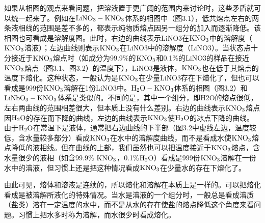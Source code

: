 如果从相图的观点来看问题，把溶液置于更广阔的范围内来讨论时，这些矛盾就可以统一起来了。例如在$\rm LiNO_3-KNO_3$体系的相图中（图3.1），低共熔点左右的两条液相线的范围是差不多的，都表示纯物质熔点因另一组分的加入而逐渐降低。该相图也可看成是溶解度图。此时，右边的曲线表示LiNO3在$\rm KNO_3$中的溶解度（$\rm KNO_3$溶液）；左边曲线则表示$\rm KNO_3$在LiNO3中的溶解度（LiNO3）。当状态点十分接近于$\rm KNO_3$熔点时（如成分为99.9\%的$\rm KNO_3$和0.1\%的LiNO3的样品在接近$\rm KNO_3$熔点（图3.1、图3.2）的温度下），LiNO3是液体，$\rm KNO_3$也在低于其熔点的温度下熔化。这种状态，一般认为是$\rm KNO_3$在少量LiNO3存在下熔化了，但也可以看成是999份$\rm KNO_3$溶解在1份LiNO3中。$\rm H_2O-KNO_3$体系的相图（图3.2）和$\rm LiNbO_3-KNO_3$体系是类似的。不同的是，其中一个组分，即H2O的熔点很低，左右两曲线的范围相差很大，但本质上没有什么差别。右边的曲线表示$\rm KNO_3$熔点因$\rm H_2O$的存在而下降的曲线，左边的曲线表示$\rm KNO_3$使$\rm H_2O$的冰点下降的曲线。由于$\rm H_2O$在常温下是液体，通常把右边曲线的下半部（图3.2中虚线左边，温度较低，含水量较多部分）看成$\rm KNO_3$在水中的溶解度曲线，而不是看成水使$\rm KNO_3$熔点降低的液相线。但在曲线的上部，我们虽然也可以把温度接近于$\rm KNO_3$熔点，含水量很少的液相（如含99.9\% $\rm KNO_3$，0.1\%$\rm H_2O$）看成是999份$\rm KNO_3$溶解在一份水中的溶液，但习惯上还是把这种情况看成$\rm KNO_3$在少量水的存在下熔化了。

由此可见，熔体和溶液是连续的，所以熔化和溶解在本质上是一样的。可以把熔化看成是被溶解所液化的特殊情况。当水是溶液的一个组分时，一般总是看成溶质（盐类）溶在一定温度的水中，而不是从水的存在使盐的熔点降低这个角度来看问题。习惯上把水多时称为溶解，而水很少时看成熔化。

